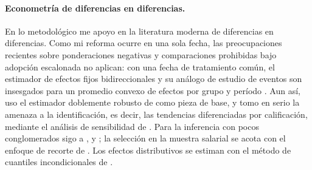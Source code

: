 \paragraph{Econometría de diferencias en diferencias.} En lo metodológico me apoyo en la literatura moderna de diferencias en diferencias. Como mi reforma ocurre en una sola fecha, las preocupaciones recientes sobre ponderaciones negativas y comparaciones prohibidas bajo adopción escalonada \citep{goodmanbacon_2021, dechaisemartin_2020, sun_abraham_2021, callaway_santanna_2021} no aplican: con una fecha de tratamiento común, el estimador de efectos fijos bidireccionales y su análogo de estudio de eventos son insesgados para un promedio convexo de efectos por grupo y período \citep{roth_2023_trending, baker_larcker_wang_2022}. Aun así, uso el estimador doblemente robusto de \citet{santanna_zhao_2020} como pieza de base, y tomo en serio la amenaza a la identificación, es decir, las tendencias diferenciadas por calificación, mediante el análisis de sensibilidad de \citet{rambachan_roth_2023}. Para la inferencia con pocos conglomerados sigo a \citet{bertrand_2004}, \citet{cameron_2008_bootstrap} y \citet{pustejovsky_tipton_2018}; la selección en la muestra salarial se acota con el enfoque de recorte de \citet{lee_2009}. Los efectos distributivos se estiman con el método de cuantiles incondicionales de \citet{firpo_fortin_lemieux_2009}.
